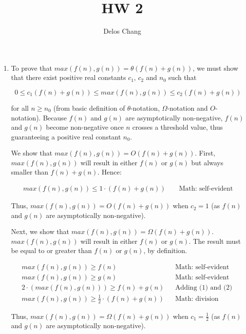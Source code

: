 \documentclass[a4paper]{report}
\title{HW 2}
\author{Delos Chang}
\date{}
\begin{document}
  \begin{enumerate}
    \item To prove that $max(f(n),g(n)) = \theta (f(n) + g(n))$, we must show that there exist positive real constants $c_{1}$, $c_{2}$ and $n_{0}$ such that

      $$0 \leq c_{1}(f(n) + g(n)) \leq max(f(n),g(n)) \leq c_{2}(f(n) + g(n))$$
    
    for all $n \geq n_{0}$ (from basic definition of $\theta$-notation, $\Omega$-notation and $O$-notation). 
    Because $f(n)$ and $g(n)$ are asymptotically non-negative, $f(n)$ and $g(n)$ become non-negative once $n$ crosses a threshold value, thus guaranteeing a positive real constant $n_{0}$.

    We show that $max(f(n), g(n)) = O(f(n) + g(n))$.
    First, $max(f(n), g(n))$ will result in either $f(n)$ or $g(n)$ but always smaller than $f(n) + g(n)$. Hence:

    \begin{align}
      max(f(n), g(n)) \leq 1 \cdot (f(n) + g(n))              &&\text{ Math: self-evident}
    \end{align}

    Thus, $max(f(n), g(n)) = O(f(n) + g(n))$ when $c_{2} = 1$ (as $f(n)$ and $g(n)$ are asymptotically non-negative). 

    Next, we show that $max(f(n), g(n)) = \Omega(f(n) + g(n))$. $max(f(n), g(n))$ will result in either $f(n)$ or $g(n)$. The result must be equal to or greater than $f(n)$ or $g(n)$, by definition.

    \setcounter{equation}{0}
    \begin{align}
      max(f(n), g(n)) \geq  f(n)                          &&\text{Math: self-evident}\\
      max(f(n), g(n)) \geq  g(n)                          &&\text{Math: self-evident}\\
      2 \cdot (max(f(n),g(n))) \geq f(n) + g(n)               &&\text{Adding (1) and (2) }\\
      max(f(n),g(n)) \geq \frac{1}{2} \cdot (f(n) + g(n))       &&\text{Math: division}
    \end{align}

    Thus, $max(f(n), g(n)) = \Omega(f(n) + g(n))$ when $c_{1} = \frac{1}{2}$ (as $f(n)$ and $g(n)$ are asymptotically non-negative). 


\end{enumerate}
\end{document}
